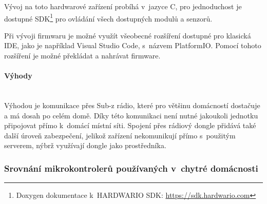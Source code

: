 Vývoj na toto hardwarové zařízení probíhá v~jazyce C, pro jednoduchost je dostupné SDK\footnote{Doxygen dokumentace k~HARDWARIO SDK: \url{https://sdk.hardwario.com}} pro ovládání všech dostupných modulů a senzorů.

Při vývoji firmwaru je možné využít všeobecné rozšíření dostupné pro klasická IDE, jako je například Visual Studio Code, s~názvem PlatformIO. Pomocí tohoto rozšíření je možné překládat a nahrávat firmware.

\paragraph*{Výhody}\mbox{} \\
Výhodou je komunikace přes Sub-z rádio, které pro většinu domácností dostačuje a má dosah po celém domě. Díky této komunikaci není nutné jakoukoli jednotku připojovat přímo k~domácí místní síti. Spojení přes rádiový dongle přidává také další úroveň zabezpečení, jelikož zařízení nekomunikují přímo s~použitým serverem, nýbrž využívají dongle jako prostředníka.

\subsubsection*{Srovnání mikrokontrolerů používaných v~chytré domácnosti}

